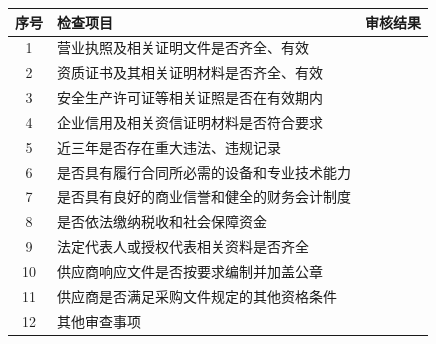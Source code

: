 \documentclass[UTF8,10pt,a4paper,fontset=fandol]{ctexart}
\newcommand{\fieldvalue}[1]{#1}
\newcommand{\handwritten}[1]{#1}
\begin{document}
\vspace{0.5em}

\begin{tabularx}{\textwidth}{|c|X|c|}
\hline
序号 & 检查项目 & 审核结果 \\
\hline
1 &
营业执照及相关证明文件是否齐全、有效 &
\fieldvalue{\handwritten{\checkmark}} \\
\hline
2 &
资质证书及其相关证明材料是否齐全、有效 &
\fieldvalue{\handwritten{\checkmark}} \\
\hline
3 &
安全生产许可证等相关证照是否在有效期内 &
\fieldvalue{\handwritten{\checkmark}} \\
\hline
4 &
企业信用及相关资信证明材料是否符合要求 &
\fieldvalue{\handwritten{\checkmark}} \\
\hline
5 &
近三年是否存在重大违法、违规记录 &
\fieldvalue{\handwritten{\checkmark}} \\
\hline
6 &
是否具有履行合同所必需的设备和专业技术能力 &
\fieldvalue{\handwritten{\checkmark}} \\
\hline
7 &
是否具有良好的商业信誉和健全的财务会计制度 &
\fieldvalue{\handwritten{\checkmark}} \\
\hline
8 &
是否依法缴纳税收和社会保障资金 &
\fieldvalue{\handwritten{\checkmark}} \\
\hline
9 &
法定代表人或授权代表相关资料是否齐全 &
\fieldvalue{\handwritten{\checkmark}} \\
\hline
10 &
供应商响应文件是否按要求编制并加盖公章 &
\fieldvalue{\handwritten{\checkmark}} \\
\hline
11 &
供应商是否满足采购文件规定的其他资格条件 &
\fieldvalue{\handwritten{\checkmark}} \\
\hline
12 &
其他审查事项 &
\fieldvalue{\handwritten{\checkmark}} \\
\hline
\end{tabularx}
\end{document}
